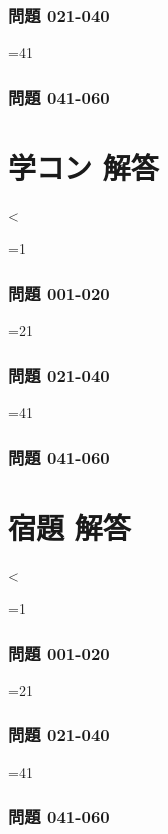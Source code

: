 \documentclass[twocolumn]{jsreport}
\newcommand{\DSQuestionGroupFromNumber}[1]{%
\ifnum#1<21 001-020%
\else\ifnum#1<41 021-040%
\else 041-060%
\fi\fi
}
\newcounter{qnumg}
\newcounter{qnums}
\begin{document}
\subsection{問題 021-040}
\else\ifnum\value{q}=41
\newpage
\subsection{問題 041-060}
\fi\fi\fi



\repeat

\clearpage
\chapter{学コン 解答}

\setcounter{q}{0}
\loop \ifnum\value{q}<\value{qnumg}


\edef\qgroup{\DSQuestionGroupFromNumber{\number\value{q}}}
\edef\qnumber{\SMQuestionNumberThreeDigits{\number\value{q}}}

\ifnum\value{q}=1
\subsection{問題 001-020}
\else\ifnum\value{q}=21
\newpage
\subsection{問題 021-040}
\else\ifnum\value{q}=41
\newpage
\subsection{問題 041-060}
\fi\fi\fi



\repeat

\clearpage
\chapter{宿題 解答}

\setcounter{q}{0}
\loop \ifnum\value{q}<\value{qnums}


\edef\qgroup{\DSQuestionGroupFromNumber{\number\value{q}}}
\edef\qnumber{\SMQuestionNumberThreeDigits{\number\value{q}}}

\ifnum\value{q}=1
\subsection{問題 001-020}
\else\ifnum\value{q}=21
\newpage
\subsection{問題 021-040}
\else\ifnum\value{q}=41
\newpage
\subsection{問題 041-060}
\fi\fi\fi



\repeat

\onecolumn
\thispagestyle{empty}
\begin{multicols}{5}
 \printindex
\end{multicols}
\end{document}
